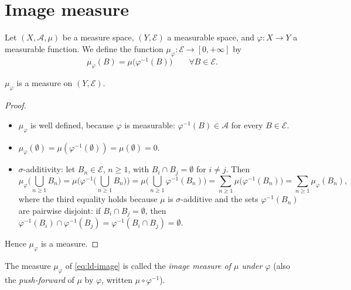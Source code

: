 
\section{Image measure}\label{sec:ld-image}

Let $(X,\mathcal A,\mu)$ be a measure space, $(Y,\mathcal E)$ a measurable space, and
$\varphi:X\to Y$ a measurable function. We define the function
$\mu_\varphi:\mathcal E\to[0,+\infty]$ by
\begin{equation}\label{eq:ld-image}
  \mu_\varphi(B)=\mu\big(\varphi^{-1}(B)\big)\qquad\forall B\in\mathcal E .
\end{equation}

\begin{proposition}\label{prop:ld-image-is-measure}
$\mu_\varphi$ is a measure on $(Y,\mathcal E)$.
\end{proposition}

\begin{proof}
\begin{itemize}
  \item $\mu_\varphi$ is well defined, because $\varphi$ is measurable: $\varphi^{-1}(B)\in\mathcal A$
    for every $B\in\mathcal E$.
  \item $\mu_\varphi(\emptyset)=\mu(\varphi^{-1}(\emptyset))=\mu(\emptyset)=0$.
  \item $\sigma$-additivity: let $B_n\in\mathcal E$, $n\ge1$, with $B_i\cap B_j=\emptyset$ for
    $i\ne j$. Then
    \[
      \mu_\varphi\Big(\bigcup_{n\ge1}B_n\Big)=\mu\Big(\varphi^{-1}\Big(\bigcup_{n\ge1}B_n\Big)\Big)
      =\mu\Big(\bigcup_{n\ge1}\varphi^{-1}(B_n)\Big)=\sum_{n\ge1}\mu\big(\varphi^{-1}(B_n)\big)
      =\sum_{n\ge1}\mu_\varphi(B_n),
    \]
    where the third equality holds because $\mu$ is $\sigma$-additive and the sets
    $\varphi^{-1}(B_n)$ are pairwise disjoint: if $B_i\cap B_j=\emptyset$, then
    $\varphi^{-1}(B_i)\cap\varphi^{-1}(B_j)=\varphi^{-1}(B_i\cap B_j)=\emptyset$.
\end{itemize}
Hence $\mu_\varphi$ is a measure.
\end{proof}

\begin{definition}\label{def:ld-image-measure}
The measure $\mu_\varphi$ of \eqref{eq:ld-image} is called the \emph{image measure of $\mu$
under $\varphi$} (also the \emph{push-forward} of $\mu$ by $\varphi$, written
$\mu\circ\varphi^{-1}$).
\end{definition}

